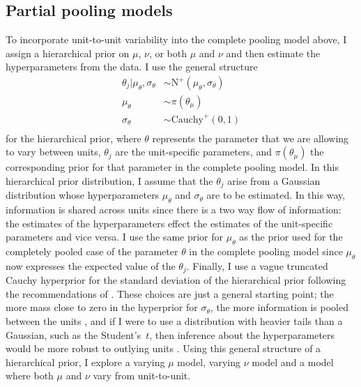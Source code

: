 \subsection{Partial pooling models} \label{subsec:partial-pooling}

To incorporate unit-to-unit variability into the complete pooling model above, I assign a hierarchical prior on $\mu$, $\nu$, or both $\mu$ and $\nu$ and then estimate the hyperparameters from the data. I use the general structure
\begin{align*}
   \theta_j| \mu_\theta, \sigma_\theta & \sim \mbox{N}^{+}(\mu_\theta, \sigma_\theta) \\
   \mu_\theta & \sim \pi(\theta_\mu)\\
   \sigma_\theta & \sim \mbox{Cauchy}^{+}(0, 1) \\
\end{align*}
for the hierarchical prior, where $\theta$ represents the parameter that we are allowing to vary between units, $\theta_j$ are the unit-specific parameters, and $\pi(\theta_\mu)$ the corresponding prior for that parameter in the complete pooling model. In this hierarchical prior distribution, I assume that the $\theta_j$ arise from a Gaussian distribution whose hyperparameters $\mu_\theta$ and $\sigma_\theta$ are to be estimated. In this way, information is shared across units since there is a two way flow of information: the estimates of the hyperparameters effect the estimates of the unit-specific parameters and vice versa. I use the same prior for $\mu_\theta$ as the prior used for the completely pooled case of the parameter $\theta$ in the complete pooling model since $\mu_\theta$ now expresses the expected value of the $\theta_j$. Finally, I use a vague truncated Cauchy hyperprior for the standard deviation of the hierarchical prior following the recommendations of \citet[chap.~17]{BDA2020}. These choices are just a general starting point; the more mass close to zero in the hyperprior for $\sigma_\theta$, the more information is pooled between the units \citep{McElreath_2020}, and if I were to use a distribution with heavier tails than a Gaussian, such as the Student's~$t$, then inference about the hyperparameters would be more robust to outlying units \citep[chap.~17]{BDA2020}. Using this general structure of a hierarchical prior, I explore a varying $\mu$ model, varying $\nu$ model and a model where both $\mu$ and $\nu$ vary from unit-to-unit.

